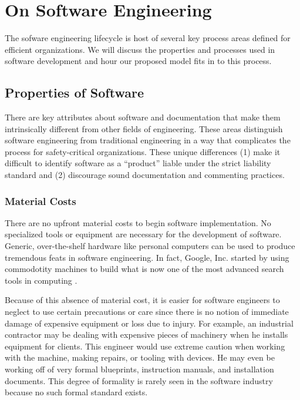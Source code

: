 \section{On Software Engineering}\label{sdp}
The sofware engineering lifecycle is host of several key process areas defined
for efficient organizations. We will discuss the properties and processes used
in software development and hour our proposed model fits in to this process.

\subsection{Properties of Software}\label{software_props}
There are key attributes about software and documentation that make them 
intrinsically different from other fields of engineering. These areas 
distinguish software engineering from traditional engineering in a way that 
complicates the process for safety-critical organizations. These unique
differences (1) make it difficult to identify software as a ``product'' liable
under the strict liability standard and (2) discourage sound documentation and
commenting practices.

\subsubsection*{Material Costs}

There are no upfront material costs to begin software implementation. No
specialized tools or equipment are necessary for the development of software.
Generic, over-the-shelf hardware like personal computers can be used to produce
tremendous feats in software engineering. In fact, Google, Inc. started by using
commodotity machines to build what is now one of the most advanced search tools 
in computing \cite{Google}.

Because of this absence of material cost, it is easier for software engineers to
neglect to use certain precautions or care since there is no notion of immediate
damage of expensive equipment or loss due to injury. For example, an industrial
contractor may be dealing with expensive pieces of machinery when he installs
equipment for clients. This engineer would use extreme caution when working with
the machine, making repairs, or tooling with devices. He may even be working off
of very formal blueprints, instruction manuals, and installation documents. This
degree of formality is rarely seen in the software industry because no such
formal standard exists.

